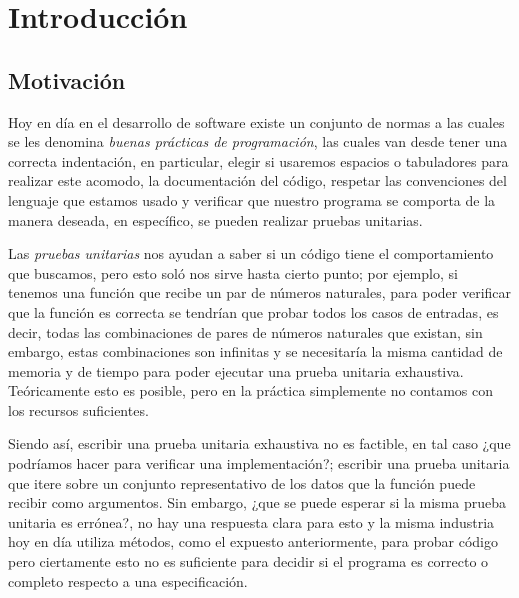 \chapter{Introducción}

\section{Motivación}
\label{motivation}
Hoy en día en el desarrollo de software existe un conjunto de normas a las cuales se les denomina
\textit{buenas pr\'acticas de programaci\'on}, las cuales van desde tener una correcta
indentaci\'on, en particular, elegir si usaremos espacios o tabuladores para realizar este acomodo, la
documentaci\'on del c\'odigo, respetar las convenciones del lenguaje que estamos usado y verificar
que nuestro programa se comporta de la manera deseada, en espec\'ifico, se pueden realizar pruebas unitarias.

Las \textit{pruebas unitarias} nos ayudan a saber si un código tiene el comportamiento
que buscamos, pero esto sol\'o nos sirve hasta cierto punto; por ejemplo, si tenemos una funci\'on
que recibe un par de números naturales, para poder verificar que la funci\'on es
correcta se tendrían que probar todos los casos de entradas, es decir, todas las combinaciones de pares de números
naturales que existan, sin embargo, estas combinaciones son infinitas y se necesitaría la misma
cantidad de memoria y de tiempo para poder ejecutar una prueba unitaria exhaustiva.
Teóricamente esto es posible, pero en la pr\'actica simplemente no contamos con los recursos suficientes.

Siendo as\'i, escribir una prueba unitaria exhaustiva no es factible, en tal caso ¿que podríamos
hacer para verificar una implementaci\'on?; escribir una prueba unitaria que itere sobre un conjunto representativo de los datos que la
funci\'on puede recibir como argumentos. Sin embargo, ¿que se puede esperar si la misma prueba unitaria es errónea?,
no hay una respuesta clara para esto y la misma industria hoy en día utiliza métodos, como el
expuesto anteriormente, para probar c\'odigo pero ciertamente esto no es suficiente para decidir si el programa es
correcto o completo respecto a una especificaci\'on.

